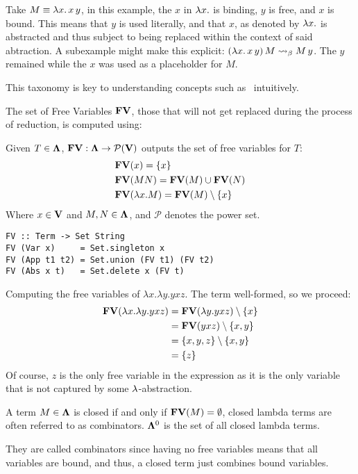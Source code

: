 \documentclass[12pt]{book}
\begin{document}
\begin{example}
  Take $ M \equiv \lambda x . \, x \, y $, in this example, the $x$ in $\lambda x. $ is binding, $y$ is free, and $x$ is bound. This means that $y$ is used literally, and that $x$, as denoted by $\lambda x.$ is abstracted and thus subject to being replaced within the context of said abtraction. A subexample might make this explicit: $ (\lambda x . \, x \, y) \, M \mathrel{\leadsto}_\beta M \, y $. The $y$ remained while the $x$ was used as a placeholder for $M$.
\end{example}
\begin{remark}
  This taxonomy is key to understanding concepts such as \aequiv \ intuitively.
\end{remark}
The set of Free Variables $\mathbf{FV}$, those that will not get replaced during the process of reduction, is computed using:
\begin{definition} Given $T \in \mathbf{\Lambda} $, $\mathbf{FV} : \mathbf{\Lambda} \to \mathcal{P}(\mathbf{V}) $ outputs the set of free variables for $T$:
  \begin{align*}
    & \mathbf{FV}(x) = \{x\}\\
    & \mathbf{FV}(MN) = \mathbf{FV}(M) \cup \mathbf{FV}(N) \\
    & \mathbf{FV}(\lambda x . M) = \mathbf{FV}(M) \setminus \{x\}
  \end{align*}
  Where $ x \in \mathbf{V} $ and $ M, N \in \mathbf{\Lambda} $, and $\mathcal{P}$ denotes the power set.
  \begin{lstlisting}[style=haskellstyle,caption={Implementation of FV in Haskell.}]
FV :: Term -> Set String
FV (Var x)     = Set.singleton x
FV (App t1 t2) = Set.union (FV t1) (FV t2)
FV (Abs x t)   = Set.delete x (FV t)
  \end{lstlisting}
\end{definition}
\begin{example} Computing the free variables of $\lambda x . \lambda y . y x z$. The term well-formed, so we proceed:
  \begin{align*}
    \mathbf{FV}(\lambda x . \lambda y . y x z) &= \mathbf{FV}(\lambda y . yxz) \setminus \{x\} \\
                                        &= \mathbf{FV}(yxz) \setminus \{x, y\} \\
                                        &= \{x, y, z\} \setminus \{x, y\} \\
                                        &= \{z\}
  \end{align*}
  Of course, $z$ is the only free variable in the expression as it is the only variable that is not captured by some $\lambda$-abstraction.
\end{example}
\begin{definition}
  A term $M \in \mathbf{\Lambda}$ is closed if and only if $\mathbf{FV}(M) = \emptyset$, closed lambda terms are often referred to as combinators. $\mathbf{\Lambda}^0$ is the set of all closed lambda terms.
\end{definition}
\begin{note} They are called combinators since having no free variables means that all variables are bound, and thus, a closed term just combines bound variables.
\end{note}
\end{document}
